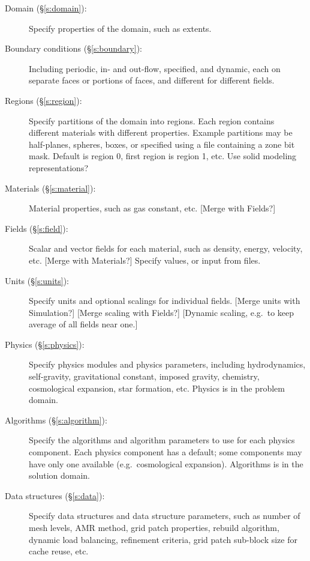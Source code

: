 \documentclass{book}
\begin{document}
\begin{description}

 \item [Domain (\S\ref{s:domain}): ] Specify properties of the domain, such as extents.

 \item [Boundary conditions (\S\ref{s:boundary}): ] Including periodic, in- and out-flow,
 specified, and dynamic, each on separate faces or portions of faces,
 and different for different fields.

 \item [Regions (\S\ref{s:region}): ] Specify partitions of the domain into regions.
 Each region contains different materials with different properties.
 Example partitions may be half-planes, spheres, boxes, or specified
 using a file containing a zone bit mask.  Default is region 0, first
 region is region 1, etc.  Use solid modeling representations?

 \item [Materials (\S\ref{s:material}): ] Material properties, such as gas constant, etc.
 [Merge with Fields?]

 \item [Fields (\S\ref{s:field}): ] Scalar and vector fields for each material, such as
 density, energy, velocity, etc.  [Merge with Materials?]  Specify
 values, or input from files.

 \item [Units (\S\ref{s:units}): ] Specify units and optional scalings for individual
 fields.  [Merge units with Simulation?] [Merge scaling with Fields?] 
 [Dynamic scaling, e.g.~to keep average of all fields near one.]

 \item [Physics (\S\ref{s:physics}): ] Specify physics modules and physics parameters,
 including hydrodynamics, self-gravity, gravitational constant,
 imposed gravity, chemistry, cosmological expansion, star formation,
 etc.  Physics is in the problem domain.

 \item [Algorithms (\S\ref{s:algorithm}): ] Specify the algorithms and algorithm parameters
 to use for each physics component.  Each physics component has a
 default; some components may have only one available
 (e.g.~cosmological expansion).  Algorithms is in the solution domain.

 \item [Data structures (\S\ref{s:data}): ] Specify data structures and data structure
 parameters, such as number of mesh levels, AMR method, grid patch
 properties, rebuild algorithm, dynamic load balancing, refinement
 criteria, grid patch sub-block size for cache reuse, etc.


\end{description}
\end{document}
